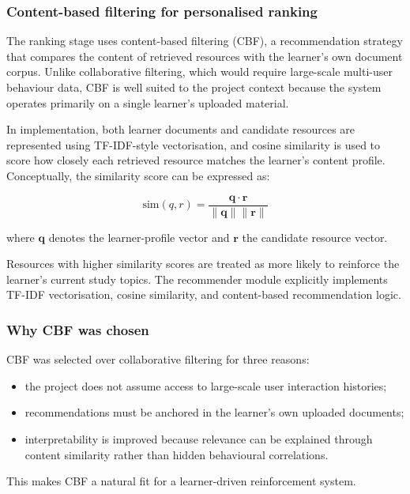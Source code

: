 \documentclass[10pt,journal,compsoc]{IEEEtran}
\begin{document}
\subsubsection{Content-based filtering for personalised ranking}

The ranking stage uses content-based filtering (CBF), a recommendation strategy that compares the content of retrieved resources with the learner's own document corpus. Unlike collaborative filtering, which would require large-scale multi-user behaviour data, CBF is well suited to the project context because the system operates primarily on a single learner's uploaded material.

In implementation, both learner documents and candidate resources are represented using TF-IDF-style vectorisation, and cosine similarity is used to score how closely each retrieved resource matches the learner's content profile. Conceptually, the similarity score can be expressed as:

\begin{equation}
\mathrm{sim}(q,r)=\frac{\mathbf{q}\cdot\mathbf{r}}{\|\mathbf{q}\|\|\mathbf{r}\|}
\end{equation}

where $\mathbf{q}$ denotes the learner-profile vector and $\mathbf{r}$ the candidate resource vector.

Resources with higher similarity scores are treated as more likely to reinforce the learner's current study topics. The recommender module explicitly implements TF-IDF vectorisation, cosine similarity, and content-based recommendation logic.

\subsubsection{Why CBF was chosen}

CBF was selected over collaborative filtering for three reasons:

\begin{itemize}
\item the project does not assume access to large-scale user interaction histories;
\item recommendations must be anchored in the learner's own uploaded documents;
\item interpretability is improved because relevance can be explained through content similarity rather than hidden behavioural correlations.
\end{itemize}

This makes CBF a natural fit for a learner-driven reinforcement system.
\end{document}
